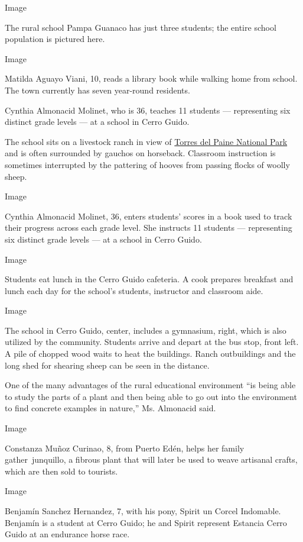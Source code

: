 Image

The rural school Pampa Guanaco has just three students; the entire
school population is pictured here.

Image

Matilda Aguayo Viani, 10, reads a library book while walking home from
school. The town currently has seven year-round residents.

Cynthia Almonacid Molinet, who is 36, teaches 11 students ---
representing six distinct grade levels --- at a school in Cerro Guido.

The school sits on a livestock ranch in view of
\href{https://www.conaf.cl/parques/parque-nacional-torres-del-paine/}{Torres
del Paine National Park} and is often surrounded by gauchos on
horseback. Classroom instruction is sometimes interrupted by the
pattering of hooves from passing flocks of woolly sheep.

Image

Cynthia Almonacid Molinet, 36, enters students' scores in a book used to
track their progress across each grade level. She instructs 11 students
--- representing six distinct grade levels --- at a school in Cerro
Guido.

Image

Students eat lunch in the Cerro Guido cafeteria. A cook prepares
breakfast and lunch each day for the school's students, instructor and
classroom aide.

Image

The school in Cerro Guido, center, includes a gymnasium, right, which is
also utilized by the community. Students arrive and depart at the bus
stop, front left. A pile of chopped wood waits to heat the buildings.
Ranch outbuildings and the long shed for shearing sheep can be seen in
the distance.

One of the many advantages of the rural educational environment ``is
being able to study the parts of a plant and then being able to go out
into the environment to find concrete examples in nature,'' Ms.
Almonacid said.

Image

Constanza Muñoz Curinao, 8, from Puerto Edén, helps her family
gather~junquillo, a fibrous plant that will later be used to weave
artisanal crafts, which are then sold to tourists.

Image

Benjamín Sanchez Hernandez, 7, with his pony, Spirit un Corcel
Indomable. Benjamín is a student at Cerro Guido; he and Spirit represent
Estancia Cerro Guido at an endurance horse race.

